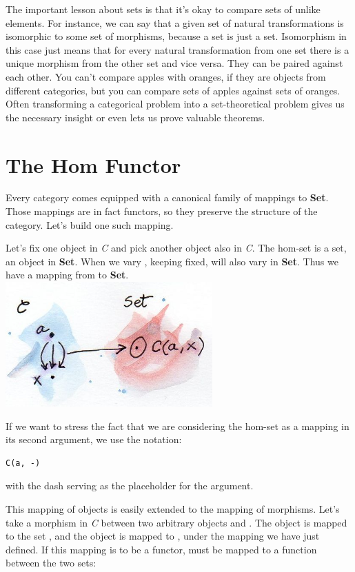 The important lesson about sets is that it's okay to compare sets of
unlike elements. For instance, we can say that a given set of natural
transformations is isomorphic to some set of morphisms, because a set is
just a set. Isomorphism in this case just means that for every natural
transformation from one set there is a unique morphism from the other
set and vice versa. They can be paired against each other. You can't
compare apples with oranges, if they are objects from different
categories, but you can compare sets of apples against sets of oranges.
Often transforming a categorical problem into a set-theoretical problem
gives us the necessary insight or even lets us prove valuable theorems.

\section{The Hom Functor}\label{the-hom-functor}

Every category comes equipped with a canonical family of mappings to
\textbf{Set}. Those mappings are in fact functors, so they preserve the
structure of the category. Let's build one such mapping.

Let's fix one object  in \emph{C} and pick another object
 also in \emph{C}. The hom-set  is a set, an
object in \textbf{Set}. When we vary , keeping 
fixed,  will also vary in \textbf{Set}. Thus we have a
mapping from  to \textbf{Set}.\\
\includegraphics[width=3.12500in]{images/hom-set.jpg}

If we want to stress the fact that we are considering the hom-set as a
mapping in its second argument, we use the notation:

\begin{verbatim}
C(a, -)
\end{verbatim}

with the dash serving as the placeholder for the argument.

This mapping of objects is easily extended to the mapping of morphisms.
Let's take a morphism  in \emph{C} between two arbitrary
objects  and . The object  is mapped to
the set , and the object  is mapped to
, under the mapping we have just defined. If this
mapping is to be a functor,  must be mapped to a function
between the two sets:

